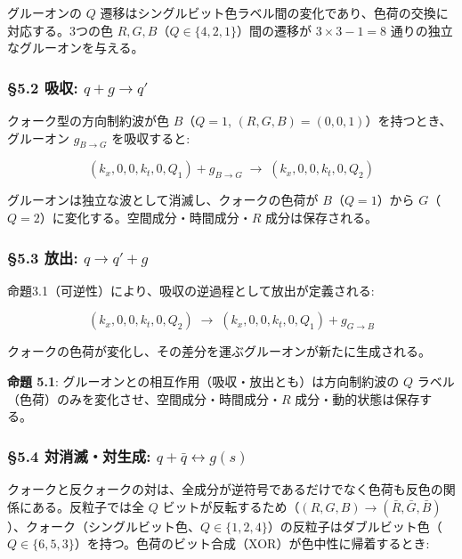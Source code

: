 \documentclass[
  a4paper,11pt]{ltjsarticle}
\theoremstyle{definition}
\theoremstyle{remark}
\begin{document}
グルーオンの \(Q\)
遷移はシングルビット色ラベル間の変化であり、色荷の交換に対応する。3つの色
\(R, G, B\)（\(Q \in \{4, 2, 1\}\)）間の遷移が \(3 \times 3 - 1 = 8\)
通りの独立なグルーオンを与える。

\subsubsection{\texorpdfstring{§5.2 吸収:
\(q + g \to q'\)}{§5.2 吸収: q + g \textbackslash to q\textquotesingle{}}}\label{ux5438ux53ce-q-g-to-q}

クォーク型の方向制約波が色 \(B\)（\(Q = 1\),
\((R,G,B) = (0,0,1)\)）を持つとき、グルーオン \(g_{B \to G}\)
を吸収すると:

\[(k_x, 0, 0, k_t, 0, Q_1) + g_{B \to G} \;\longrightarrow\; (k_x, 0, 0, k_t, 0, Q_2)\]

グルーオンは独立な波として消滅し、クォークの色荷が
\(B\)（\(Q = 1\)）から
\(G\)（\(Q = 2\)）に変化する。空間成分・時間成分・\(R\)
成分は保存される。

\subsubsection{\texorpdfstring{§5.3 放出:
\(q \to q' + g\)}{§5.3 放出: q \textbackslash to q\textquotesingle{} + g}}\label{ux653eux51fa-q-to-q-g}

命題3.1（可逆性）により、吸収の逆過程として放出が定義される:

\[(k_x, 0, 0, k_t, 0, Q_2) \;\longrightarrow\; (k_x, 0, 0, k_t, 0, Q_1) + g_{G \to B}\]

クォークの色荷が変化し、その差分を運ぶグルーオンが新たに生成される。

\textbf{命題 5.1}:
グルーオンとの相互作用（吸収・放出とも）は方向制約波の \(Q\)
ラベル（色荷）のみを変化させ、空間成分・時間成分・\(R\)
成分・動的状態は保存する。

\subsubsection{\texorpdfstring{§5.4 対消滅・対生成:
\(q + \bar{q} \leftrightarrow g(s)\)}{§5.4 対消滅・対生成: q + \textbackslash bar\{q\} \textbackslash leftrightarrow g(s)}}\label{ux5bfeux6d88ux6ec5ux5bfeux751fux6210-q-barq-leftrightarrow-gs}

クォークと反クォークの対は、全成分が逆符号であるだけでなく色荷も反色の関係にある。反粒子では全
\(Q\)
ビットが反転するため（\((R,G,B) \to (\bar{R},\bar{G},\bar{B})\)）、クォーク（シングルビット色、\(Q \in \{1,2,4\}\)）の反粒子はダブルビット色（\(Q \in \{6,5,3\}\)）を持つ。色荷のビット合成（XOR）が色中性に帰着するとき:
\end{document}
